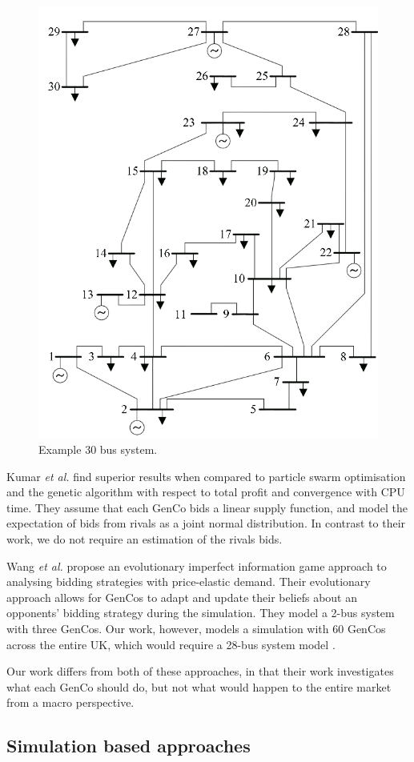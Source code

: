 \begin{figure}
	\centering
	\includegraphics[width=0.6\columnwidth]{Chapter7/figures/lit-review/IEEE_30bus.png}
	\caption{Example 30 bus system.}
	\label{fig:30-bus-system.}
\end{figure}

Kumar \textit{et al.} find superior results when compared to particle swarm optimisation and the genetic algorithm with respect to total profit and convergence with CPU time. They assume that each GenCo bids a linear supply function, and model the expectation of bids from rivals as a joint normal distribution. In contrast to their work, we do not require an estimation of the rivals bids.

Wang \textit{et al.} \cite{Wang2011} propose an evolutionary imperfect information game approach to analysing bidding strategies with price-elastic demand. Their evolutionary approach allows for GenCos to adapt and update their beliefs about an opponents' bidding strategy during the simulation. They model a 2-bus system with three GenCos. Our work, however, models a simulation with 60 GenCos across the entire UK, which would require a 28-bus system model \cite{Bell2010}. 

Our work differs from both of these approaches, in that their work investigates what each GenCo should do, but not what would happen to the entire market from a macro perspective.

\subsection{Simulation based approaches}

